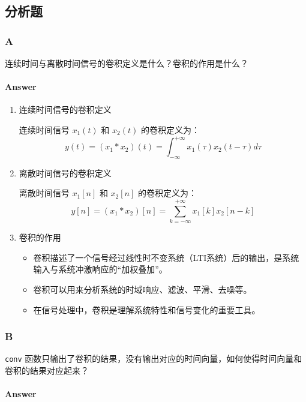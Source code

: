 \documentclass[12pt,a4paper,UTF8]{article}
\providecommand{\tightlist}{%
      \setlength{\itemsep}{0pt}\setlength{\parskip}{0pt}}
\begin{document}
    \subsection{分析题}\label{ux5206ux6790ux9898}

\subsubsection{A}\label{a}

连续时间与离散时间信号的卷积定义是什么？卷积的作用是什么？

\paragraph{Answer}\label{answer}

\begin{enumerate}
\def\labelenumi{\arabic{enumi}.}
\item
  连续时间信号的卷积定义

  连续时间信号 \(x_1(t)\) 和 \(x_2(t)\) 的卷积定义为： \[
   y(t) = (x_1 * x_2)(t) = \int_{-\infty}^{+\infty} x_1(\tau) x_2(t - \tau) d\tau
   \]
\item
  离散时间信号的卷积定义

  离散时间信号 \(x_1[n]\) 和 \(x_2[n]\) 的卷积定义为： \[
   y[n] = (x_1 * x_2)[n] = \sum_{k=-\infty}^{+\infty} x_1[k] x_2[n - k]
   \]
\item
  卷积的作用

  \begin{itemize}
  \tightlist
  \item
    卷积描述了一个信号经过线性时不变系统（LTI系统）后的输出，是系统输入与系统冲激响应的``加权叠加''。
  \item
    卷积可以用来分析系统的时域响应、滤波、平滑、去噪等。
  \item
    在信号处理中，卷积是理解系统特性和信号变化的重要工具。
  \end{itemize}
\end{enumerate}

    \subsubsection{B}\label{b}

\texttt{conv}
函数只输出了卷积的结果，没有输出对应的时间向量，如何使得时间向量和卷积的结果对应起来？

\paragraph{Answer}\label{answer}
\end{document}

